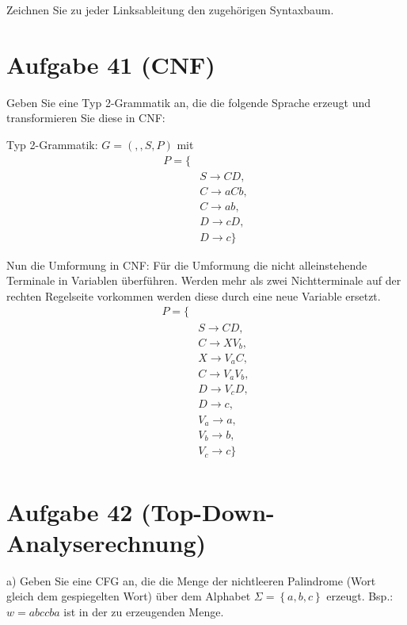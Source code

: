 \documentclass{article}
\begin{document}
Zeichnen Sie zu jeder Linksableitung den zugehörigen Syntaxbaum.


\section*{Aufgabe 41 (CNF)}

Geben Sie eine Typ 2-Grammatik an, die die folgende Sprache erzeugt und transformieren Sie
diese in CNF:

Typ 2-Grammatik:
$G = ({}, {}, S, P)$ mit
\begin{equation}
\begin{split}
P = \{ \\\
&S \rightarrow CD, \\\
&C \rightarrow aCb, \\\
&C \rightarrow ab, \\\
&D \rightarrow cD, \\\
&D \rightarrow c \}
\end{split}
\end{equation}

Nun die Umformung in CNF:
Für die Umformung die nicht alleinstehende Terminale in Variablen überführen. Werden mehr als zwei Nichtterminale auf der rechten Regelseite vorkommen werden diese durch eine neue Variable ersetzt.
\begin{equation}
\begin{split}
P = \{ \\\
&S \rightarrow CD, \\
&C \rightarrow XV_b, \\\
&X \rightarrow V_aC, \\\
&C \rightarrow V_aV_b, \\\
&D \rightarrow V_cD, \\\
&D \rightarrow c, \\\
&V_a \rightarrow a, \\\
&V_b \rightarrow b, \\\
&V_c \rightarrow c \} \\\
\end{split}
\end{equation}


\section*{Aufgabe 42 (Top-Down-Analyserechnung)}

a) Geben Sie eine CFG an, die die Menge der nichtleeren Palindrome (Wort gleich dem gespiegelten Wort) über dem Alphabet $\Sigma = \left\{a, b, c\right\}$ erzeugt. Bsp.: $w=abccba$ ist in der zu erzeugenden Menge.
\end{document}
